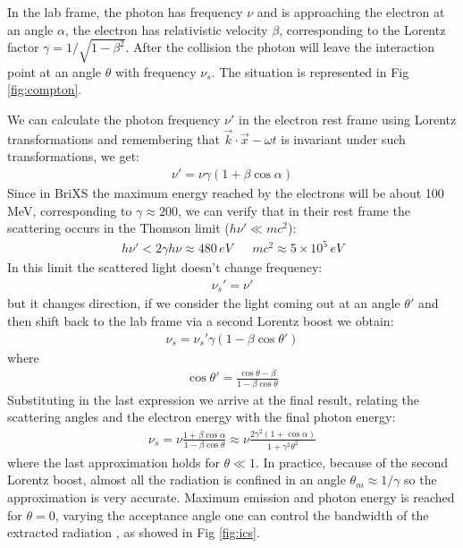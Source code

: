 In the lab frame, the photon has frequency $\nu$ and is approaching the electron at an angle $\alpha$, the electron has relativistic velocity $\beta$, corresponding to the Lorentz factor $\gamma = 1/\sqrt{1-\beta^2}$. After the collision the photon will leave the interaction point at an angle $\theta$ with frequency $\nu_s$. The situation is represented in Fig \ref{fig:compton}.

We can calculate the photon frequency $\nu'$ in the electron rest frame using Lorentz transformations and remembering that $\vec{k} \cdot \vec{x}-\omega t$ is invariant under such transformations, we get:
\begin{align}
\nu' = \nu \gamma \left( 1+\beta \cos\alpha\right)
\end{align}
Since in BriXS the maximum energy reached by the electrons will be about 100\,MeV, corresponding to $\gamma \approx 200$, we can verify that in their rest frame the scattering occurs in the Thomson limit ($h \nu' \ll mc^2$):
\begin{align*}
h \nu' < 2 \gamma h \nu \approx 480\,eV && mc^2 \approx 5 \times 10^5\,eV
\end{align*}
In this limit the scattered light doesn't change frequency:
\begin{align}
\nu_s' = \nu'
\end{align}
but it changes direction, if we consider the light coming out at an angle $\theta'$ and then shift back to the lab frame via a second Lorentz boost we obtain:
\begin{align}
\nu_s = \nu_s' \gamma \left( 1-\beta \cos\theta'\right)
\end{align}
where
\begin{align}
\cos \theta' = \frac{\cos\theta -\beta}{1-\beta\cos\theta}
\end{align}
Substituting in the last expression we arrive at the final result, relating the scattering angles and the electron energy with the final photon energy:
\begin{align}
\nu_s = \nu\frac{1+\beta\cos\alpha}{1-\beta\cos\theta} \approx \nu\frac{2\gamma^2\left( 1+\cos\alpha\right)}{1+\gamma^2\theta^2}
\label{eq:ICS}
\end{align}
where the last approximation holds for $\theta\ll 1$. In practice, because of the second Lorentz boost, almost all the radiation is confined in an angle $\theta_m \approx 1/\gamma$ so the approximation is very accurate. Maximum emission and photon energy is reached for $\theta = 0$, varying the acceptance angle one can control the bandwidth of the extracted radiation \parencite{Drebot2017}, as showed in Fig \ref{fig:ics}.
